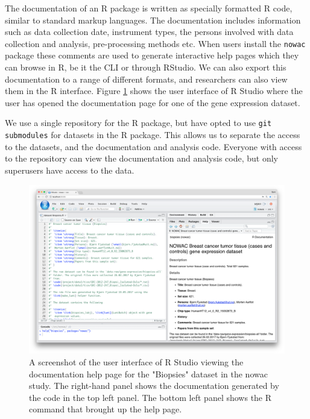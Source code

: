 The documentation of an R package is written as specially formatted R code,
similar to standard markup languages.  The documentation includes information
such as data collection date, instrument types, the persons involved with data
collection and analysis, pre-processing methods etc.  When users install the
\texttt{nowac} package these comments are used to generate interactive help
pages which they can browse in R, be it the CLI or through RStudio.  We can also
export this documentation to a range of different formats, and researchers can
also view them in the R interface. Figure \ref{rpkgfig} shows the user interface
of R Studio where the user has opened the documentation page for one of the gene
expression dataset. 

We use a single repository for the R package, but have opted to use \texttt{git
submodules} for datasets in the R package.  This allows us to separate the
access to the datasets, and the documentation and analysis code. Everyone with
access to the repository can view the documentation and analysis code, but only
superusers have access to the data.

\begin{figure}
  \includegraphics[width=\linewidth]{figures/rpkg.png}
  \caption{A screenshot of the user interface of R Studio viewing the
    documentation help page for the "Biopsies" dataset in the \gls{nowac} study.
    The right-hand panel shows the documentation generated by the code in the
    top left panel. The bottom left panel shows the R command that brought up
    the help page.}
    \label{rpkgfig} 
\end{figure}

